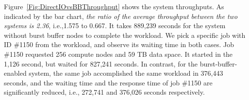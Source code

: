 
Figure~\ref{Fig:DirectIOvsBBThroughput} shows the system throughputs.
As indicated by the bar chart, \textit{the ratio of the average throughput between the two systems is 2.36}, i.e.,1.575 to 0.667.
It takes 889,239 seconds for the system without burst buffer nodes to
complete the workload. We pick a specific job with ID \#1150 from the workload, and observe its
waiting time in both cases.
Job \#1150 requested 256 compute nodes and 59 TB data space.
It started in the 1,126 second, but waited for 827,241 seconds.
In contrast, for the burst-buffer-enabled system, the same job accomplished the same workload in 376,443 seconds, and the waiting time and the response time of job \#1150
are significantly reduced, i.e., 272,741 and 376,026 seconds respectively.


